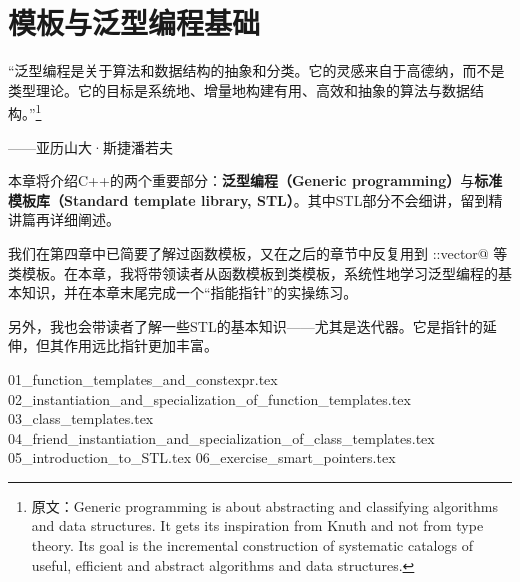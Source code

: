 \chapter{模板与泛型编程基础}
{\kaishu \large ``泛型编程是关于算法和数据结构的抽象和分类。它的灵感来自于高德纳，而不是类型理论。它的目标是系统地、增量地构建有用、高效和抽象的算法与数据结构。''\footnote{原文：Generic programming is about abstracting and classifying algorithms and data structures. It gets its inspiration from Knuth and not from type theory. Its goal is the incremental construction of systematic catalogs of useful, efficient and abstract algorithms and data structures.}}
\begin{flushright}——亚历山大·斯捷潘若夫\end{flushright}\par
本章将介绍C++的两个重要部分：\textbf{泛型编程（Generic programming）}与\textbf{标准模板库（Standard template library, STL）}。其中STL部分不会细讲，留到精讲篇再详细阐述。\par
我们在第四章中已简要了解过函数模板，又在之后的章节中反复用到 \lstinline@std::vector@ 等类模板。在本章，我将带领读者从函数模板到类模板，系统性地学习泛型编程的基本知识，并在本章末尾完成一个``指能指针''的实操练习。\par
另外，我也会带读者了解一些STL的基本知识——尤其是迭代器。它是指针的延伸，但其作用远比指针更加丰富。\par
{01_function_templates_and_constexpr.tex}
{02_instantiation_and_specialization_of_function_templates.tex}
{03_class_templates.tex}
{04_friend_instantiation_and_specialization_of_class_templates.tex}
{05_introduction_to_STL.tex}
{06_exercise_smart_pointers.tex}